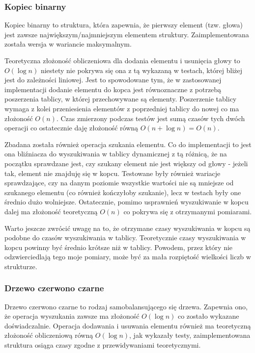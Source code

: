 \documentclass{article}
\begin{document}
        \subsubsection*{Kopiec binarny}
        Kopiec binarny to struktura, która zapewnia, że pierwszy element (tzw. głowa) jest zawsze największym/najmniejszym elementem struktury.
        Zaimplementowana została wersja w wariancie maksymalnym. 
        
        Teoretyczna złożoność obliczeniowa dla dodania elementu i usunięcia głowy to $O(\log n)$ niestety nie pokrywa się ona z tą wykazaną w testach, 
        której bliżej jest do zależności liniowej. Jest to spowodowane tym, że w zastosowanej implementacji dodanie elementu do kopca 
        jest równoznaczne z potrzebą poszerzenia tablicy, w której przechowywane są elementy. Poszerzenie tablicy wymaga z kolei przeniesienia elementów 
        z poprzedniej tablicy do nowej co ma złożoność $O(n)$. Czas zmierzony podczas testów jest sumą czasów tych dwóch operacji co ostatecznie daję 
        złożoność równą $O(n + \log n) = O(n)$.

        Zbadana została również operacja szukania elementu. Co do implementacji to jest ona bliźniacza do wyszukiwania w tablicy dynamicznej z tą różnicą, że
        na początku sprawdzane jest, czy szukany element nie jest większy od głowy - jeżeli tak, element nie znajduję się w kopcu. Testowane były również wariacje sprawdzające,
        czy na danym poziomie wszystkie wartości nie są mniejsze od szukanego elementu (co również kończyłoby szukanie), lecz w testach były one średnio dużo wolniejsze.
        Ostatecznie, pomimo usprawnień wyszukiwanie w kopcu dalej ma złożoność teoretyczną $O(n)$ co pokrywa się z otrzymanymi pomiarami.

        Warto jeszcze zwrócić uwagę na to, że otrzymane czasy wyszukiwania w kopcu są podobne do czasów wyszukiwania w tablicy. Teoretycznie czasy wyszukiwania w kopcu
        powinny być średnio krótsze niż w tablicy. Powodem, przez który nie odzwierciedlają tego moje pomiary, może być za mała rozpiętość wielkości liczb w strukturze. 

        \subsubsection*{Drzewo czerwono czarne}
        Drzewo czerwono czarne to rodzaj samobalansującego się drzewa. Zapewnia ono, że operacja wyszukania zawsze ma złożoność $O(\log n)$
        co zostało wykazane doświadczalnie.
        Operacja dodawania i usuwania elementu również ma teoretyczną złożoność obliczeniową równą $O(\log n)$, jak wykazały testy,
        zaimplementowana struktura osiąga czasy zgodne z przewidywaniami teoretycznymi.
\end{document}
